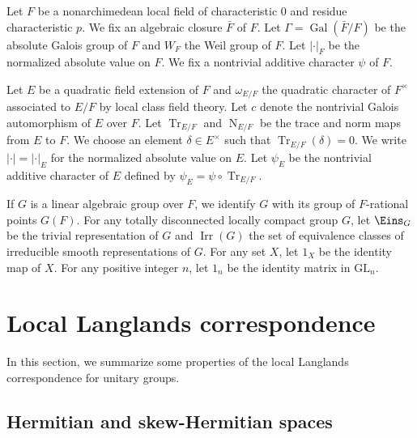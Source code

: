 \documentclass[11pt]{amsart}
\numberwithin{equation}{section}
\theoremstyle{plain}
\theoremstyle{definition}
\theoremstyle{remark}
\def\Irr{\operatorname{Irr}}
\def\N{\operatorname{N}}
\def\Tr{\operatorname{Tr}}
\def\GL{\mathrm{GL}}
\def\1{\Eins}
\begin{document}
Let $F$ be a nonarchimedean local field of characteristic $0$ and residue characteristic $p$.
We fix an algebraic closure $\bar{F}$ of $F$.
Let $\Gamma = \operatorname{Gal}(\bar{F}/F)$ be the absolute Galois group of $F$ and $W_F$ the Weil group of $F$.
Let $|\cdot|_F$ be the normalized absolute value on $F$.
We fix a nontrivial additive character $\psi$ of $F$.

Let $E$ be a quadratic field extension of $F$ and $\omega_{E/F}$ the quadratic character of $F^{\times}$ associated to $E/F$ by local class field theory.
Let $c$ denote the nontrivial Galois automorphism of $E$ over $F$.
Let $\Tr_{E/F}$ and $\N_{E/F}$ be the trace and norm maps from $E$ to $F$.
We choose an element $\delta \in E^{\times}$ such that $\Tr_{E/F}(\delta) = 0$.
We write $| \cdot | = |\cdot|_E$ for the normalized absolute value on $E$.
Let $\psi_E$ be the nontrivial additive character of $E$ defined by $\psi_E = \psi \circ \Tr_{E/F}$.

If $G$ is a linear algebraic group over $F$, we identify $G$ with its group of $F$-rational points $G(F)$.
For any totally disconnected locally compact group $G$, let $\1_G$ be the trivial representation of $G$ and $\Irr(G)$ the set of equivalence classes of irreducible smooth representations of $G$.
For any set $X$, let $1_X$ be the identity map of $X$.
For any positive integer $n$, let $1_n$ be the identity matrix in $\GL_n$.

\section{\textbf{Local Langlands correspondence}}

In this section, we summarize some properties of the local Langlands correspondence for unitary groups.

\subsection{Hermitian and skew-Hermitian spaces}
\end{document}
